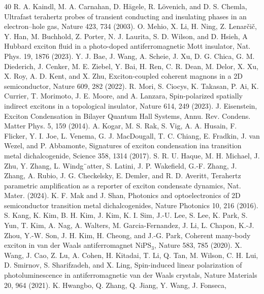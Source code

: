\documentclass[%
 reprint,
superscriptaddress,
 amsmath,amssymb,
 aps,
]{revtex4-2}
\begin{document}
\begin{thebibliography}{40}
R. A. Kaindl, M. A. Carnahan, D. H\"{a}gele, R. L\"{o}venich,
and D. S. Chemla, Ultrafast terahertz probes of transient
conducting and insulating phases in an electron–hole gas,
Nature 423, 734 (2003).
O. Mehio, X. Li, H. Ning, Z. Lenar\v{c}i\v{c}, Y. Han, M. Buchhold,
Z. Porter, N. J. Laurita, S. D. Wilson, and D. Hsieh,
A Hubbard exciton fluid in a photo-doped antiferromagnetic
Mott insulator, Nat. Phys. 19, 1876 (2023).
Y. J. Bae, J. Wang, A. Scheie, J. Xu, D. G. Chica, G. M.
Diederich, J. Cenker, M. E. Ziebel, Y. Bai, H. Ren, C. R.
Dean, M. Delor, X. Xu, X. Roy, A. D. Kent, and X. Zhu,
Exciton-coupled coherent magnons in a 2D semiconductor,
Nature 609, 282 (2022).
R. Mori, S. Ciocys, K. Takasan, P. Ai, K. Currier, T. Morimoto,
J. E. Moore, and A. Lanzara, Spin-polarized spatially
indirect excitons in a topological insulator, Nature
614, 249 (2023).
J. Eisenstein, Exciton Condensation in Bilayer Quantum
Hall Systems, Annu. Rev. Condens. Matter Phys. 5, 159
(2014).
A. Kogar, M. S. Rak, S. Vig, A. A. Husain, F. Flicker,
Y. I. Joe, L. Venema, G. J. MacDougall, T. C. Chiang,
E. Fradkin, J. van Wezel, and P. Abbamonte, Signatures
of exciton condensation ina transition metal dichalcogenide,
Science 358, 1314 (2017).
S. R. U. Haque, M. H. Michael, J. Zhu, Y. Zhang,
L. Windg¨atter, S. Latini, J. P. Wakefield, G.-F. Zhang,
J. Zhang, A. Rubio, J. G. Checkelsky, E. Demler, and
R. D. Averitt, Terahertz parametric amplification as a
reporter of exciton condensate dynamics, Nat. Mater.
(2024).
K. F. Mak and J. Shan, Photonics and optoelectronics of
2D semiconductor transition metal dichalcogenides, Nature
Photonics 10, 216 (2016).
S. Kang, K. Kim, B. H. Kim, J. Kim, K. I. Sim, J.-U.
Lee, S. Lee, K. Park, S. Yun, T. Kim, A. Nag, A. Walters,
M. Garcia-Fernandez, J. Li, L. Chapon, K.-J. Zhou,
Y.-W. Son, J. H. Kim, H. Cheong, and J.-G. Park, Coherent
many-body exciton in van der Waals antiferromagnet
NiPS$_3$, Nature 583, 785 (2020).
X. Wang, J. Cao, Z. Lu, A. Cohen, H. Kitadai, T. Li,
Q. Tan, M. Wilson, C. H. Lui, D. Smirnov, S. Sharifzadeh,
and X. Ling, Spin-induced linear polarization of
photoluminescence in antiferromagnetic van der Waals
crystals, Nature Materials 20, 964 (2021).
K. Hwangbo, Q. Zhang, Q. Jiang, Y. Wang, J. Fonseca,

\end{thebibliography}
\end{document}
